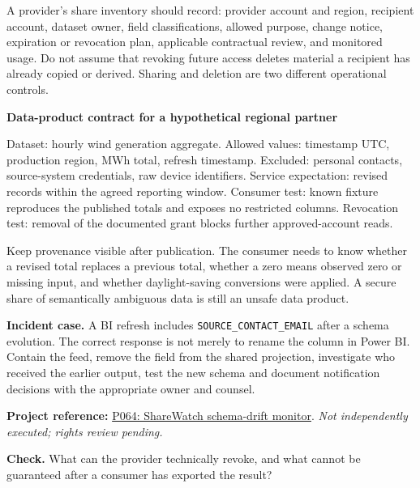 \documentclass[11pt,twoside]{article}
\newcommand{\repo}[2]{\par\begingroup\fontsize{8.0}{9.6}\selectfont\sffamily\color{inkgray}\textbf{Project reference:} \href{#2}{#1}. \textit{Not independently executed; rights review pending.}\par\endgroup}
\begin{document}
A provider's share inventory should record: provider account and region, recipient account, dataset owner, field classifications, allowed purpose, change notice, expiration or revocation plan, applicable contractual review, and monitored usage. Do not assume that revoking future access deletes material a recipient has already copied or derived. Sharing and deletion are two different operational controls.
\begin{whitebox}\textbf{Data-product contract for a hypothetical regional partner}\par
Dataset: hourly wind generation aggregate. Allowed values: timestamp UTC, production region, MWh total, refresh timestamp. Excluded: personal contacts, source-system credentials, raw device identifiers. Service expectation: revised records within the agreed reporting window. Consumer test: known fixture reproduces the published totals and exposes no restricted columns. Revocation test: removal of the documented grant blocks further approved-account reads.
\end{whitebox}
Keep provenance visible after publication. The consumer needs to know whether a revised total replaces a previous total, whether a zero means observed zero or missing input, and whether daylight-saving conversions were applied. A secure share of semantically ambiguous data is still an unsafe data product.

\textbf{Incident case.} A BI refresh includes \texttt{SOURCE\_CONTACT\_EMAIL} after a schema evolution. The correct response is not merely to rename the column in Power BI. Contain the feed, remove the field from the shared projection, investigate who received the earlier output, test the new schema and document notification decisions with the appropriate owner and counsel.
\repo{P064: ShareWatch schema-drift monitor}{https://github.com/Snowflake-Labs/sfguide-monitor-schema-drift-in-data-shares-with-sharewatch}
\textbf{Check.} What can the provider technically revoke, and what cannot be guaranteed after a consumer has exported the result?
\newpage
\end{document}
